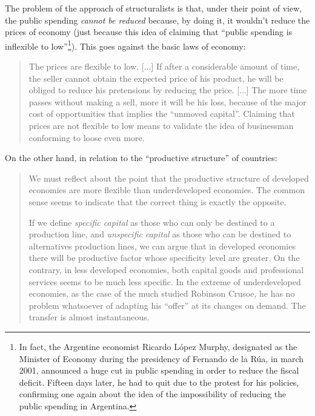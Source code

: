 \documentclass[12pt,a4paper,twoside]{book}
\begin{document}
The problem of the approach of structuralists is that, under their point of view, the public spending \textit{cannot be reduced} because, by doing it, it wouldn't reduce the prices of economy (just because this idea of claiming that “public spending is inflexible to low”\footnote{In fact, the Argentine economist Ricardo López Murphy, designated as the Minister of Economy during the presidency of Fernando de la Rúa, in march 2001, announced a huge cut in public spending in order to reduce the fiscal deficit. Fifteen days later, he had to quit due to the protest for his policies, confirming one again about the idea of the impossibility of reducing the public spending in Argentina.}). This goes against the basic laws of economy:

\begin{quotation}
The prices are flexible to low. [...] If after a considerable amount of time, the seller cannot obtain the expected price of his product, he will be obliged to reduce his pretensions by reducing the price. [...] The more time passes without making a sell, more it will be his loss, because of the major cost of opportunities that implies the “unmoved capital”. Claiming that prices are not flexible to low means to validate the idea of businessman conforming to loose even more. \cite[p. 467]{elementos-econopol}
\end{quotation}

On the other hand, in relation to the “productive structure” of countries:

\begin{quotation}
We must reflect about the point that the productive structure of developed economies are more flexible than underdeveloped economies. The common sense seems to indicate that the correct thing is exactly the opposite.

If we define \textit{specific capital} as those who can only be destined to a production line, and \textit{unspecific capital} as those who can be destined to alternatives production lines, we can argue that in developed economies there will be productive factor whose specificity level are greater. On the contrary, in less developed economies, both capital goods and professional services seems to be much less specific. In the extreme of underdeveloped economies, as the case of the much studied Robinson Crusoe, he has no problem whatsoever of adapting his “offer” at its changes on demand. The transfer is almost instantaneous. \cite[p. 468]{elementos-econopol}
\end{quotation}
\end{document}
